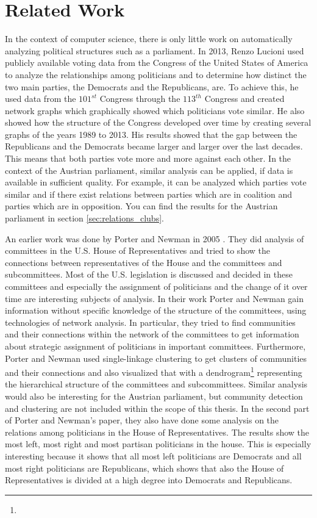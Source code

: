 \chapter{Related Work}
\label{chap:relatedwork}

In the context of computer science, there is only little work on automatically analyzing political structures such as a parliament. In 2013, Renzo Lucioni \cite{Lucioni_2015} used publicly available voting data from the Congress of the United States of America to analyze the relationships among politicians and to determine how distinct the two main parties, the Democrats and the Republicans, are. To achieve this, he used data from the $101^{st}$ Congress through the $113^{th}$ Congress and created network graphs which graphically showed which politicians vote similar. He also showed how the structure of the Congress developed over time by creating several graphs of the years 1989 to 2013. His results showed that the gap between the Republicans and the Democrats became larger and larger over the last decades. This means that both parties vote more and more against each other. In the context of the Austrian parliament, similar analysis can be applied, if data is available in sufficient quality. For example, it can be analyzed which parties vote similar and if there exist relations between parties which are in coalition and parties which are in opposition. You can find the results for the Austrian parliament in section \ref{sec:relations_clubs}.

An earlier work was done by Porter and Newman in 2005 \cite{Porter_2005}. They did analysis of committees in the U.S. House of Representatives and tried to show the connections between representatives of the House and the committees and subcommittees. Most of the U.S. legislation is discussed and decided in these committees and especially the assignment of politicians and the change of it over time are interesting subjects of analysis. In their work Porter and Newman gain information without specific knowledge of the structure of the committees, using technologies of network analysis. In particular, they tried to find communities and their connections within the network of the committees to get information about strategic assignment of politicians in important committees. Furthermore, Porter and Newman used single-linkage clustering to get clusters of communities and their connections and also visualized that with a dendrogram\footnote{} representing the hierarchical structure of the committees and subcommittees. Similar analysis would also be interesting for the Austrian parliament, but community detection and clustering are not included within the scope of this thesis. In the second part of Porter and Newman's paper, they also have done some analysis on the relations among politicians in the House of Representatives. The results show the most left, most right and most partisan politicians in the house. This is especially interesting because it shows that all most left politicians are Democrats and all most right politicians are Republicans, which shows that also the House of Representatives is divided at a high degree into Democrats and Republicans.

